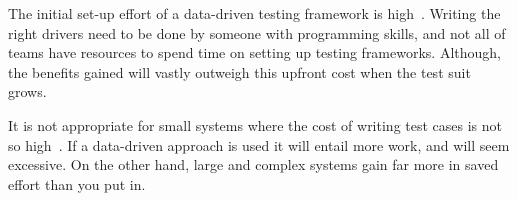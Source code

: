 The initial set-up effort of a data-driven testing framework is high~\cite{Fewster99}.
Writing the right drivers need to be done by someone with programming skills,
and not all of teams have resources to spend time on setting up testing
frameworks. Although, the benefits gained will vastly outweigh this upfront cost
when the test suit grows.

It is not appropriate for small systems where the cost of writing test cases is
not so high~\cite{Fewster99}. If a data-driven approach is used it will entail
more work, and will seem excessive. On the other hand, large and complex systems
gain far more in saved effort than you put in.\\[1mm]

